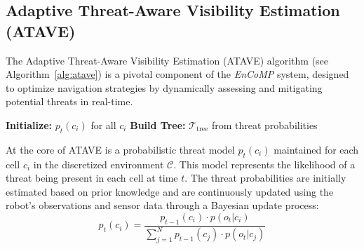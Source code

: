 \subsection{Adaptive Threat-Aware Visibility Estimation (ATAVE)}
\label{subsec:atave}
The Adaptive Threat-Aware Visibility Estimation (ATAVE) algorithm (see Algorithm~\ref{alg:atave}) is a pivotal component of the \textit{EnCoMP} system, designed to optimize navigation strategies by dynamically assessing and mitigating potential threats in real-time.

\begin{algorithm}
\caption{Adaptive Threat-Aware Visibility Estimation (ATAVE)}
\label{alg:atave}
\SetAlgoLined
{}
\textbf{Initialize:} $p_t(c_i)$ for all $c_i$\;
\textbf{Build Tree:} $\mathcal{T}_{\text{tree}}$ from threat probabilities\;
\end{algorithm}

At the core of ATAVE is a probabilistic threat model $p_t(c_i)$ maintained for each cell $c_i$ in the discretized environment $\mathcal{C}$. This model represents the likelihood of a threat being present in each cell at time $t$. The threat probabilities are initially estimated based on prior knowledge and are continuously updated using the robot's observations and sensor data through a Bayesian update process:
\begin{equation}
p_t(c_i) = \frac{p_{t-1}(c_i) \cdot p(o_t | c_i)}{\sum_{j=1}^{N} p_{t-1}(c_j) \cdot p(o_t | c_j)}
\end{equation}

